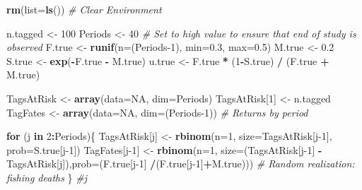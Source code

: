 \documentclass[
]{krantz}
\makeatletter
\newenvironment{Shaded}{\begin{snugshade}}{\end{snugshade}}
\newcommand{\AttributeTok}[1]{\textcolor[rgb]{0.27,0.27,0.27}{#1}}
\newcommand{\CommentTok}[1]{\textcolor[rgb]{0.37,0.37,0.37}{\textit{#1}}}
\newcommand{\ConstantTok}[1]{\textcolor[rgb]{0.37,0.37,0.37}{#1}}
\newcommand{\ControlFlowTok}[1]{\textcolor[rgb]{0.27,0.27,0.27}{\textbf{#1}}}
\newcommand{\DecValTok}[1]{\textcolor[rgb]{0.06,0.06,0.06}{#1}}
\newcommand{\FloatTok}[1]{\textcolor[rgb]{0.06,0.06,0.06}{#1}}
\newcommand{\FunctionTok}[1]{\textcolor[rgb]{0.27,0.27,0.27}{\textbf{#1}}}
\newcommand{\NormalTok}[1]{#1}
\newcommand{\OtherTok}[1]{\textcolor[rgb]{0.37,0.37,0.37}{#1}}
\newcommand{\SpecialCharTok}[1]{\textcolor[rgb]{0.43,0.43,0.43}{\textbf{#1}}}
\newenvironment{kframe}{%
\medskip{}
\setlength{\fboxsep}{.8em}
 \def\at@end@of@kframe{}%
 \ifinner\ifhmode%
  \def\at@end@of@kframe{\end{minipage}}%
  \begin{minipage}{\columnwidth}%
 \fi\fi%
 \def\FrameCommand##1{\hskip\@totalleftmargin \hskip-\fboxsep
 \colorbox{shadecolor}{##1}\hskip-\fboxsep
     \hskip-\linewidth \hskip-\@totalleftmargin \hskip\columnwidth}%
 \MakeFramed {\advance\hsize-\width
   \@totalleftmargin\z@ \linewidth\hsize
   \@setminipage}}%
 {\par\unskip\endMakeFramed%
 \at@end@of@kframe}
\renewenvironment{Shaded}{\begin{kframe}}{\end{kframe}}
\makeatother
\begin{document}
\begin{Shaded}
\begin{Highlighting}[]
\FunctionTok{rm}\NormalTok{(}\AttributeTok{list=}\FunctionTok{ls}\NormalTok{()) }\CommentTok{\# Clear Environment}

\NormalTok{n.tagged }\OtherTok{\textless{}{-}} \DecValTok{100}
\NormalTok{Periods }\OtherTok{\textless{}{-}} \DecValTok{40} 
\CommentTok{\# Set to high value to ensure that end of study is observed}
\NormalTok{F.true }\OtherTok{\textless{}{-}} \FunctionTok{runif}\NormalTok{(}\AttributeTok{n=}\NormalTok{(Periods}\DecValTok{{-}1}\NormalTok{), }\AttributeTok{min=}\FloatTok{0.3}\NormalTok{, }\AttributeTok{max=}\FloatTok{0.5}\NormalTok{)}
\NormalTok{M.true }\OtherTok{\textless{}{-}} \FloatTok{0.2}
\NormalTok{S.true }\OtherTok{\textless{}{-}} \FunctionTok{exp}\NormalTok{(}\SpecialCharTok{{-}}\NormalTok{F.true }\SpecialCharTok{{-}}\NormalTok{ M.true)}
\NormalTok{u.true }\OtherTok{\textless{}{-}}\NormalTok{ F.true }\SpecialCharTok{*}\NormalTok{ (}\DecValTok{1}\SpecialCharTok{{-}}\NormalTok{S.true) }\SpecialCharTok{/}\NormalTok{ (F.true }\SpecialCharTok{+}\NormalTok{ M.true)}

\NormalTok{TagsAtRisk }\OtherTok{\textless{}{-}} \FunctionTok{array}\NormalTok{(}\AttributeTok{data=}\ConstantTok{NA}\NormalTok{, }\AttributeTok{dim=}\NormalTok{Periods)}
\NormalTok{TagsAtRisk[}\DecValTok{1}\NormalTok{] }\OtherTok{\textless{}{-}}\NormalTok{ n.tagged}
\NormalTok{TagFates }\OtherTok{\textless{}{-}} \FunctionTok{array}\NormalTok{(}\AttributeTok{data=}\ConstantTok{NA}\NormalTok{, }\AttributeTok{dim=}\NormalTok{(Periods}\DecValTok{{-}1}\NormalTok{)) }\CommentTok{\# Returns by period}

\ControlFlowTok{for}\NormalTok{ (j }\ControlFlowTok{in} \DecValTok{2}\SpecialCharTok{:}\NormalTok{Periods)\{}
\NormalTok{  TagsAtRisk[j] }\OtherTok{\textless{}{-}} \FunctionTok{rbinom}\NormalTok{(}\AttributeTok{n=}\DecValTok{1}\NormalTok{, }\AttributeTok{size=}\NormalTok{TagsAtRisk[j}\DecValTok{{-}1}\NormalTok{], }\AttributeTok{prob=}\NormalTok{S.true[j}\DecValTok{{-}1}\NormalTok{])}
\NormalTok{  TagFates[j}\DecValTok{{-}1}\NormalTok{] }\OtherTok{\textless{}{-}} \FunctionTok{rbinom}\NormalTok{(}\AttributeTok{n=}\DecValTok{1}\NormalTok{, }\AttributeTok{size=}\NormalTok{(TagsAtRisk[j}\DecValTok{{-}1}\NormalTok{]}
                     \SpecialCharTok{{-}}\NormalTok{TagsAtRisk[j]),}\AttributeTok{prob=}\NormalTok{(F.true[j}\DecValTok{{-}1}\NormalTok{]}
                      \SpecialCharTok{/}\NormalTok{(F.true[j}\DecValTok{{-}1}\NormalTok{]}\SpecialCharTok{+}\NormalTok{M.true))) }
  \CommentTok{\# Random realization: fishing deaths}
\NormalTok{\} }\CommentTok{\#j}


\end{Highlighting}
\end{Shaded}
\end{document}
